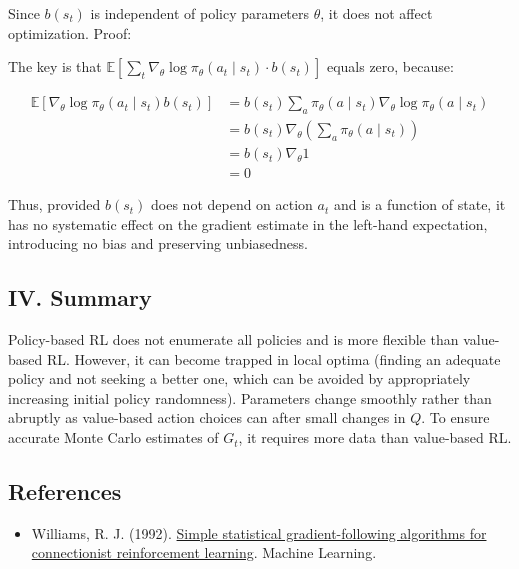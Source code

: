 Since \(b(s_t)\) is independent of policy parameters \(\theta\), it does not affect optimization. Proof:

The key is that \(\mathbb{E}[\sum_t \nabla_\theta \log \pi_\theta(a_t \mid s_t)\cdot b(s_t)]\) equals zero, because:

\[
\begin{aligned}
\mathbb{E}[\nabla_\theta \log \pi_\theta(a_t \mid s_t)b(s_t)]
&= b(s_t)\sum_a \pi_\theta(a \mid s_t)\nabla_\theta \log \pi_\theta(a \mid s_t) \\
&= b(s_t)\nabla_\theta(\sum_a \pi_\theta(a \mid s_t)) \\
&= b(s_t)\nabla_\theta 1 \\
&= 0
\end{aligned}
\]

Thus, provided \(b(s_t)\) does not depend on action \(a_t\) and is a function of state, it has no systematic effect on the gradient estimate in the left-hand expectation, introducing no bias and preserving unbiasedness.

\hypertarget{iv.-summary-1}{%
\subsection{IV. Summary}\label{iv.-summary-1}}

Policy-based RL does not enumerate all policies and is more flexible than value-based RL. However, it can become trapped in local optima (finding an adequate policy and not seeking a better one, which can be avoided by appropriately increasing initial policy randomness). Parameters change smoothly rather than abruptly as value-based action choices can after small changes in \(Q\). To ensure accurate Monte Carlo estimates of \(G_t\), it requires more data than value-based RL.

\FloatBarrier
{}
\hypertarget{references-55}{%
\subsection{References}\label{references-55}}

\vspace{0.25em}
\begin{itemize}
\tightlist
\item
  Williams, R. J. (1992). \href{https://link.springer.com/article/10.1007/BF00992696}{Simple statistical gradient-following algorithms for connectionist reinforcement learning}. Machine Learning.
\end{itemize}

\clearpage
